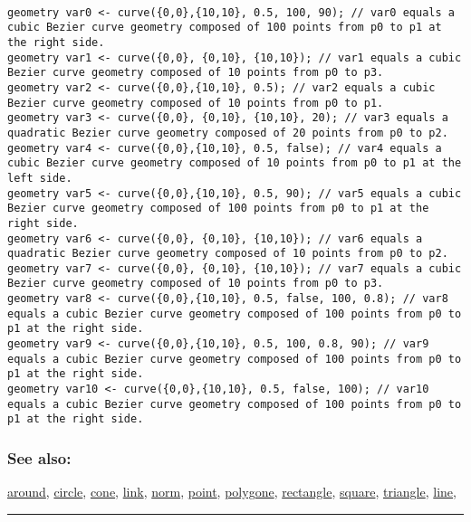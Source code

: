 \documentclass[]{book}
\theoremstyle{definition}
\theoremstyle{definition}
\theoremstyle{definition}
\theoremstyle{remark}
\begin{document}
\begin{verbatim}
 
geometry var0 <- curve({0,0},{10,10}, 0.5, 100, 90); // var0 equals a cubic Bezier curve geometry composed of 100 points from p0 to p1 at the right side. 
geometry var1 <- curve({0,0}, {0,10}, {10,10}); // var1 equals a cubic Bezier curve geometry composed of 10 points from p0 to p3. 
geometry var2 <- curve({0,0},{10,10}, 0.5); // var2 equals a cubic Bezier curve geometry composed of 10 points from p0 to p1. 
geometry var3 <- curve({0,0}, {0,10}, {10,10}, 20); // var3 equals a quadratic Bezier curve geometry composed of 20 points from p0 to p2. 
geometry var4 <- curve({0,0},{10,10}, 0.5, false); // var4 equals a cubic Bezier curve geometry composed of 10 points from p0 to p1 at the left side. 
geometry var5 <- curve({0,0},{10,10}, 0.5, 90); // var5 equals a cubic Bezier curve geometry composed of 100 points from p0 to p1 at the right side. 
geometry var6 <- curve({0,0}, {0,10}, {10,10}); // var6 equals a quadratic Bezier curve geometry composed of 10 points from p0 to p2. 
geometry var7 <- curve({0,0}, {0,10}, {10,10}); // var7 equals a cubic Bezier curve geometry composed of 10 points from p0 to p3. 
geometry var8 <- curve({0,0},{10,10}, 0.5, false, 100, 0.8); // var8 equals a cubic Bezier curve geometry composed of 100 points from p0 to p1 at the right side. 
geometry var9 <- curve({0,0},{10,10}, 0.5, 100, 0.8, 90); // var9 equals a cubic Bezier curve geometry composed of 100 points from p0 to p1 at the right side. 
geometry var10 <- curve({0,0},{10,10}, 0.5, false, 100); // var10 equals a cubic Bezier curve geometry composed of 100 points from p0 to p1 at the right side.
\end{verbatim}

\subsubsection{See also:}\label{see-also-74}

\href{operators-a-to-a.html\#around}{around},
\href{operators-b-to-c.html\#circle}{circle},
\href{operators-b-to-c.html\#cone}{cone},
\href{operators-i-to-m.html\#link}{link},
\href{operators-n-to-r.html\#norm}{norm},
\href{operators-n-to-r.html\#point}{point},
\href{operators-s-to-z.html\#polygone}{polygone},
\href{operators-n-to-r.html\#rectangle}{rectangle},
\href{operators-s-to-z.html\#square}{square},
\href{operators-s-to-z.html\#triangle}{triangle},
\href{operators-i-to-m.html\#line}{line},

\begin{center}\rule{0.5\linewidth}{\linethickness}\end{center}
\end{document}

